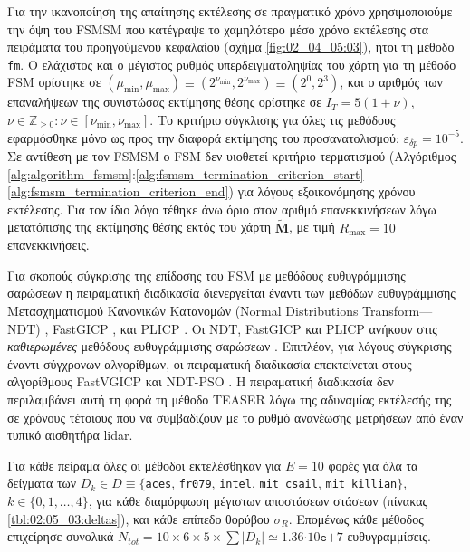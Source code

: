 Για την ικανοποίηση της απαίτησης εκτέλεσης σε πραγματικό χρόνο χρησιμοποιούμε
την όψη του FSMSM που κατέγραψε το χαμηλότερο μέσο χρόνο εκτέλεσης στα
πειράματα του προηγούμενου κεφαλαίου (σχήμα \ref{fig:02_04_05:03}), ήτοι τη
μέθοδο \texttt{fm}.  Ο ελάχιστος και ο μέγιστος ρυθμός υπερδειγματοληψίας του
χάρτη για τη μέθοδο FSM ορίστηκε σε $(\mu_{\min},\mu_{\max}) \equiv
(2^{\nu_{\min}},2^{\nu_{\max}}) \equiv (2^0,2^3)$, και ο αριθμός των
επαναλήψεων της συνιστώσας εκτίμησης θέσης ορίστηκε σε $I_T=5(1+\nu)$, $\nu \in
\mathbb{Z}_{\geq 0}: \nu \in [\nu_{\min}, \nu_{\max}]$. Το κριτήριο σύγκλισης
για όλες τις μεθόδους εφαρμόσθηκε μόνο ως προς την διαφορά εκτίμησης του
προσανατολισμού: $\varepsilon_{\delta p} = 10^{-5}$. Σε αντίθεση με τον FSMSM ο
FSM δεν υιοθετεί κριτήριο τερματισμού (Αλγόριθμος
\ref{alg:algorithm_fsmsm}:\ref{alg:fsmsm_termination_criterion_start}-\ref{alg:fsmsm_termination_criterion_end})
για λόγους εξοικονόμησης χρόνου εκτέλεσης. Για τον ίδιο λόγο τέθηκε άνω όριο
στον αριθμό επανεκκινήσεων λόγω μετατόπισης της εκτίμησης θέσης εκτός του χάρτη
$\widetilde{\bm{M}}$, με τιμή $R_{\max} = 10$ επανεκκινήσεις.

Για σκοπούς σύγκρισης της επίδοσης του FSM με μεθόδους ευθυγράμμισης σαρώσεων η
πειραματική διαδικασία διενεργείται έναντι των μεθόδων ευθυγράμμισης
Μετασχηματισμού Κανονικών Κατανομών (Normal Distributions Transform---NDT)
\cite{Bibera,ndt_code}, FastGICP \cite{Segal2009a,fgicp_code}, και PLICP
\cite{Censi2008a,plicp_code}. Οι NDT, FastGICP και PLICP ανήκουν στις
\textit{καθιερωμένες} μεθόδους ευθυγράμμισης σαρώσεων
\cite{Koide2021a,Xu2018b,Sobreira2019b,Pishehvari2019b,Qingshan2019c,Pham2021b}.
Επιπλέον, για λόγους σύγκρισης έναντι σύγχρονων αλγορίθμων, οι πειραματική
διαδικασία επεκτείνεται στους αλγορίθμους FastVGICP
\cite{Koide2021a,fgicp_code} και NDT-PSO \cite{Bouraine2021,ndt_pso_code}. Η
πειραματική διαδικασία δεν περιλαμβάνει αυτή τη φορά τη μέθοδο TEASER λόγω της
αδυναμίας εκτέλεσής της σε χρόνους τέτοιους που να συμβαδίζουν με το ρυθμό
ανανέωσης μετρήσεων από έναν τυπικό αισθητήρα lidar.

Για κάθε πείραμα όλες οι μέθοδοι εκτελέσθηκαν για $E = 10$ φορές για όλα τα
δείγματα των $D_k \in D \equiv \{$\texttt{aces}, \texttt{fr079},
\texttt{intel}, \texttt{mit\_csail}, \texttt{mit\_killian}$\}$, $k \in
\{0,1,\dots,4\}$, για κάθε διαμόρφωση μέγιστων αποστάσεων στάσεων (πίνακας
\ref{tbl:02:05_03:deltas}), και κάθε επίπεδο θορύβου $\sigma_R$.  Επομένως κάθε
μέθοδος επιχείρησε συνολικά $N_{tot} = 10 \times 6 \times 5 \times \sum
|D_k|\simeq 1.36$$\cdot10$$\texttt{e}$$+$$7$ ευθυγραμμίσεις.

